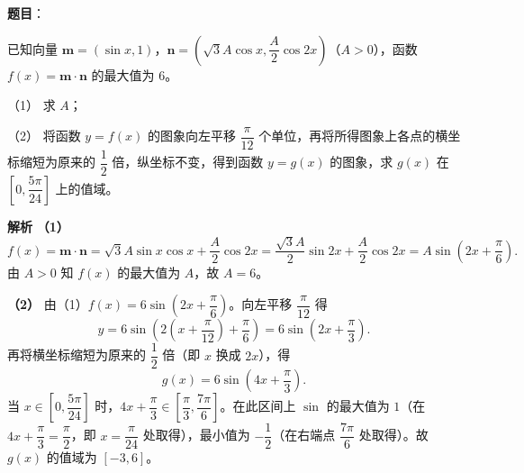 \begin{answer}

\textbf{题目}：

已知向量 $\boldsymbol m=(\sin x,1)$，$\boldsymbol n=\left(\sqrt3A\cos x,\dfrac A2\cos2x\right)$（$A>0$），函数 $f(x)=\boldsymbol m\cdot\boldsymbol n$ 的最大值为 $6$。

（1） 求 $A$；

（2） 将函数 $y=f(x)$ 的图象向左平移 $\dfrac\pi{12}$ 个单位，再将所得图象上各点的横坐标缩短为原来的 $\dfrac12$ 倍，纵坐标不变，得到函数 $y=g(x)$ 的图象，求 $g(x)$ 在 $\left[0,\dfrac{5\pi}{24}\right]$ 上的值域。

\textbf{解析}
\textbf{（1）}
\nopagebreak[4]
\[f(x)=\boldsymbol m\cdot\boldsymbol n=\sqrt3A\sin x\cos x+\frac A2\cos2x=\frac{\sqrt3A}2\sin2x+\frac A2\cos2x=A\sin\left(2x+\frac\pi6\right).\]
由 $A>0$ 知 $f(x)$ 的最大值为 $A$，故 $A=6$。

\textbf{（2）} 由（1）$f(x)=6\sin\left(2x+\dfrac\pi6\right)$。向左平移 $\dfrac\pi{12}$ 得
\nopagebreak[4]
\[y=6\sin\left(2\left(x+\frac\pi{12}\right)+\frac\pi6\right)=6\sin\left(2x+\frac\pi3\right).\]
再将横坐标缩短为原来的 $\dfrac12$ 倍（即 $x$ 换成 $2x$），得
\nopagebreak[4]
\[g(x)=6\sin\left(4x+\frac\pi3\right).\]
当 $x\in\left[0,\dfrac{5\pi}{24}\right]$ 时，$4x+\dfrac\pi3\in\left[\dfrac\pi3,\dfrac{7\pi}6\right]$。在此区间上 $\sin$ 的最大值为 $1$（在 $4x+\dfrac\pi3=\dfrac\pi2$，即 $x=\dfrac\pi{24}$ 处取得），最小值为 $-\dfrac12$（在右端点 $\dfrac{7\pi}6$ 处取得）。故 $g(x)$ 的值域为 $[-3,6]$。



\end{answer}

